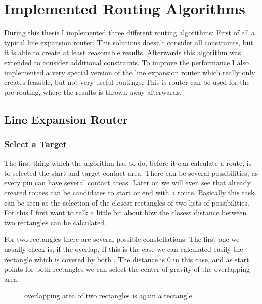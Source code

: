 \section{Implemented Routing Algorithms}
During this thesis I implemented three different routing algorithms: First of all a typical line expansion router. This solutions doesn't consider all constraints, but it is able to create at least reasonable results. Afterwards this algorithm was extended to consider additional constraints. To improve the performance I also implemented a very special version of the line expansion router which really only creates feasible, but not very useful routings. This is router can be used for the pre-routing, where the results is thrown away afterwards.

\subsection{Line Expansion Router}

\subsubsection{Select a Target}
The first thing which the algorithm has to do, before it can calculate a route, is to selected the start and target contact area. There can be several possibilities, as every pin can have several contact areas. Later on we will even see that already created routes can be candidates to start or end with a route. Basically this task can be seen as the selection of the closest rectangles of two lists of possibilities. For this I first want to talk a little bit about how the closest distance between two rectangles can be calculated.

For two rectangles there are several possible constellations. The first one we usually check is, if the overlap. If this is the case we can calculated easily the rectangle which is covered by both . The distance is 0 in this case, and as start points for both rectangles we can select the center of gravity of the overlapping area.

\begin{figure}
	\centering
	
  	\caption{overlapping area of two rectangles is again a rectangle}
	\label{fig:rectangles_overlapping}
\end{figure}


